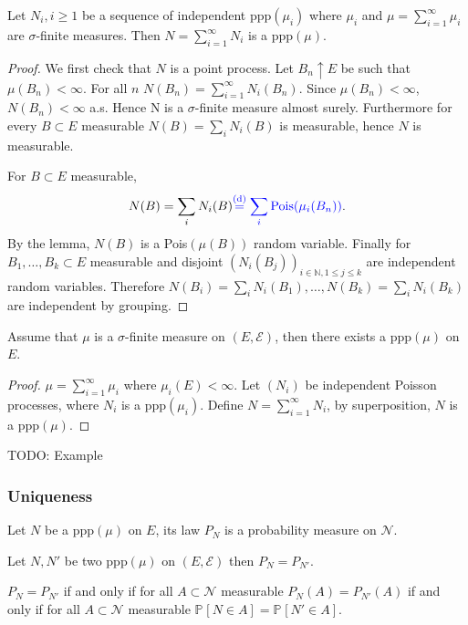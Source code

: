 \begin{theorem}[]
	Let $N_i, i\geq 1$ be a sequence of independent ppp$(\mu_i)$ where $\mu_i$ and $\mu = \sum_{i=1}^{\infty} \mu_i$ are $\sigma$-finite measures. Then $N= \sum_{i=1}^{\infty} N_i$ is a ppp$(\mu )$.
\end{theorem}
\begin{proof}
	We first check that $N$ is a point process. Let $B_n \uparrow E$ be such that $\mu (B_n)<\infty $. For all $n$ $N(B_n)=\sum_{i=1}^{\infty } N_i(B_n)$. Since $\mu(B_n)<\infty $, $N(B_n)<\infty $ a.s. Hence N is a $\sigma $-finite measure almost surely. Furthermore for every $B\subset E$ measurable $N(B) = \sum_{i}^{} N_i(B)$ is measurable, hence $N$ is measurable.

	For $B\subset E$ measurable, 
	\begin{align}
		N(B) = \sum_{i}^{} N_i(B){\color{blue} \stackrel{\textrm{(d)}}{=} \sum_{i}^{} \textrm{Pois}(\mu_i(B_n))}.
	\end{align}
	By the lemma, $N(B)$ is a Pois$(\mu (B))$ random variable. Finally for $B_1,\ldots , B_k \subset E$ measurable and disjoint $\left( N_i(B_j)\right)_{i \in \mathbb{N},1\leq j \leq k}$ are independent random variables. Therefore $N(B_i)=\sum_{i}^{} N_i(B_1) , \ldots , N(B_k) =\sum_{i}^{} N_i(B_k)$ are independent by grouping.
\end{proof}


\begin{cor}[]
Assume that $\mu$ is a $\sigma$-finite measure on $(E, \mathcal{E})$, then there exists a ppp$(\mu)$ on $E$.
\end{cor}
\begin{proof}
	$\mu = \sum_{i=1}^{\infty } \mu _i$ where $\mu _i(E) < \infty $. Let $(N_i)$ be independent Poisson processes, where $N_i$ is a ppp$(\mu _i)$. Define $N= \sum_{i=1}^{\infty } N_i$, by superposition, $N$ is a ppp$(\mu )$.
\end{proof}

{\color{blue}
TODO: Example}

\subsubsection{Uniqueness}
Let $N$ be a ppp$(\mu )$ on $E$, its law $P_N$ is a probability measure on $ \mathcal{N}$.

\begin{prop}[]
	Let $N, N'$ be two ppp$(\mu )$ on $(E, \mathcal{E})$ then $P_N = P_{N'}$.
\end{prop}
\begin{rmk}[]
	$P_N = P_{N'}$ if and only if for all $A \subset \mathcal{N}$ measurable $P_N(A) = P_{N'}(A)$ if and only if for all $A \subset \mathcal{N}$ measurable $\mathbb{P}_{} \left[ N \in A  \right]  = \mathbb{P}_{} \left[ N' \in A \right] $. 
\end{rmk}

